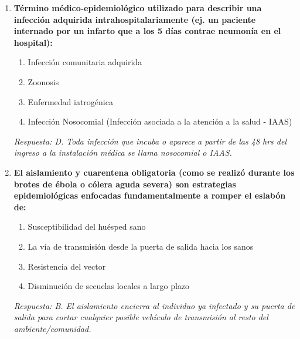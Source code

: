 \documentclass[spanish,letterpaper,oneside]{article}
\begin{document}
\begin{enumerate}[label=\textbf{\arabic*.}]
    \item \textbf{Término médico-epidemiológico utilizado para describir una infección adquirida intrahospitalariamente (ej. un paciente internado por un infarto que a los 5 días contrae neumonía en el hospital):}
    \begin{enumerate}
        \item[A)] Infección comunitaria adquirida
        \item[B)] Zoonosis
        \item[C)] Enfermedad iatrogénica
        \item[D)] Infección Nosocomial (Infección asociada a la atención a la salud - IAAS)
    \end{enumerate}
    \textit{Respuesta: D. Toda infección que incuba o aparece a partir de las 48 hrs del ingreso a la instalación médica se llama nosocomial o IAAS.}

    \item \textbf{El aislamiento y cuarentena obligatoria (como se realizó durante los brotes de ébola o cólera aguda severa) son estrategias epidemiológicas enfocadas fundamentalmente a romper el eslabón de:}
    \begin{enumerate}
        \item[A)] Susceptibilidad del huésped sano
        \item[B)] La vía de transmisión desde la puerta de salida hacia los sanos
        \item[C)] Resistencia del vector
        \item[D)] Disminución de secuelas locales a largo plazo
    \end{enumerate}
    \textit{Respuesta: B. El aislamiento encierra al individuo ya infectado y su puerta de salida para cortar cualquier posible vehículo de transmisión al resto del ambiente/comunidad.}

\end{enumerate}
\end{document}
